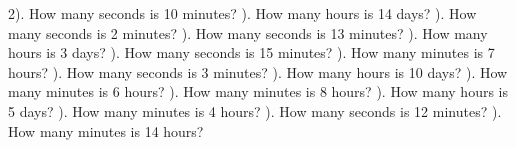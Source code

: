 \documentclass{article}%
\begin{document}
2). How many seconds is 10 minutes?%
\newline%
\newline%
). How many hours is 14 days?%
\newline%
\newline%
). How many seconds is 2 minutes?%
\newline%
\newline%
). How many seconds is 13 minutes?%
\newline%
\newline%
). How many hours is 3 days?%
\newline%
\newline%
). How many seconds is 15 minutes?%
\newline%
\newline%
). How many minutes is 7 hours?%
\newline%
\newline%
). How many seconds is 3 minutes?%
\newline%
\newline%
). How many hours is 10 days?%
\newline%
\newline%
). How many minutes is 6 hours?%
\newline%
\newline%
). How many minutes is 8 hours?%
\newline%
\newline%
). How many hours is 5 days?%
\newline%
\newline%
). How many minutes is 4 hours?%
\newline%
\newline%
). How many seconds is 12 minutes?%
\newline%
\newline%
). How many minutes is 14 hours?%
\end{document}
